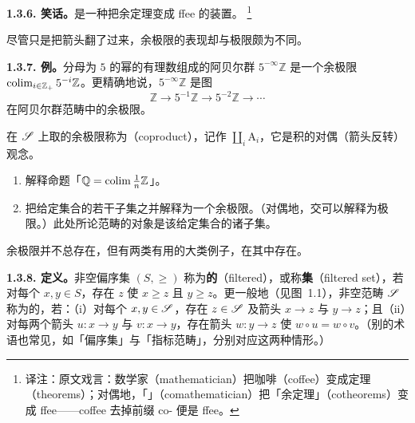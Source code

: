 \textbf{1.3.6. 笑话。}\quad \trComathematician{}是一种把余定理变成 ffee 的装置。%
\footnote{译注：原文戏言：数学家（mathematician）把咖啡（coffee）变成定理（theorems）；对偶地，「\trComathematician」（comathematician）把「余定理」（cotheorems）变成 ffee——coffee 去掉前缀 co- 便是 ffee。}

尽管只是把箭头翻了过来，余极限的表现却与极限颇为不同。

\textbf{1.3.7. 例。}\quad 分母为 $5$ 的幂的有理数组成的阿贝尔群 $5^{-\infty}\mathbb{Z}$ 是一个余极限 $\operatorname{colim}_{i\in\mathbb{Z}_+}5^{-i}\mathbb{Z}$。更精确地说，$5^{-\infty}\mathbb{Z}$ 是图
\[
\mathbb{Z}\longrightarrow 5^{-1}\mathbb{Z}\longrightarrow 5^{-2}\mathbb{Z}\longrightarrow\cdots
\]
在阿贝尔群范畴中的余极限。

在\trIndexSet{} $\mathscr{S}$ 上取的余极限称为\textbf{\trCoproduct}（coproduct），记作 $\coprod_i\mathrm{A}_i$，它是积的对偶（箭头反转）观念。

\begin{exercise}\label{ex:rational-union-colimit}
\begin{enumerate}[label=(\alph*)]
\item 解释命题「$\mathbb{Q}=\operatorname{colim}\frac{1}{n}\mathbb{Z}$」。
\item 把给定集合的若干子集之并解释为一个余极限。（对偶地，交可以解释为极限。）此处所论范畴的对象是该给定集合的诸子集。
\end{enumerate}
\end{exercise}

余极限并不总存在，但有两类有用的大类例子，在其中存在。

\textbf{1.3.8. 定义。}\quad 非空偏序集 $(S,\ge)$ 称为\textbf{\trFiltered{}的}（filtered），或称\textbf{\trFiltered{}集}（filtered set），若对每个 $x,y\in S$，存在 $z$ 使 $x\ge z$ 且 $y\ge z$。更一般地（见图~1.1），非空范畴 $\mathscr{S}$ 称为\trFiltered{}的，若：（i）对每个 $x,y\in\mathscr{S}$，存在 $z\in\mathscr{S}$ 及箭头 $x\to z$ 与 $y\to z$；且（ii）对每两个箭头 $u\colon x\to y$ 与 $v\colon x\to y$，存在箭头 $w\colon y\to z$ 使 $w\circ u=w\circ v$。（别的术语也常见，如「\trDirected{}偏序集」与「\trFiltered{}指标范畴」，分别对应这两种情形。）

